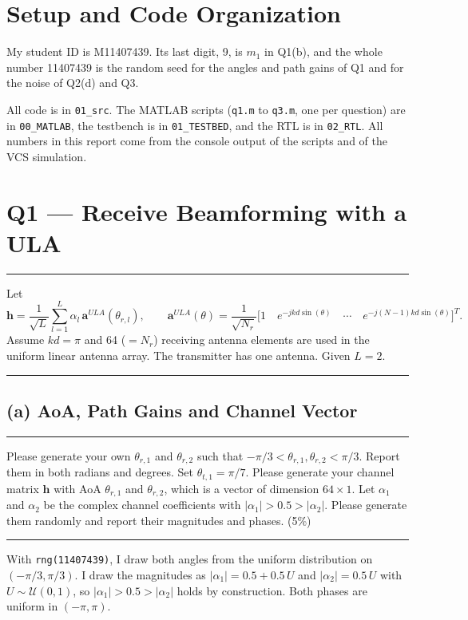 \documentclass[12pt,a4paper]{report}
\newcommand{\question}[1]{%
    \hrule
    \vspace{0.2cm}
    #1
    \vspace{0.2cm}
    \hrule
    \vspace{0.5cm}
}
\begin{document}
\chapter{Setup and Code Organization}
My student ID is M11407439. Its last digit, 9, is $m_1$ in Q1(b), and the whole number 11407439 is the random seed
for the angles and path gains of Q1 and for the noise of Q2(d) and Q3.

All code is in \texttt{01\_src}. The MATLAB scripts (\texttt{q1.m} to \texttt{q3.m}, one per question) are in
\texttt{00\_MATLAB}, the testbench is in \texttt{01\_TESTBED}, and the RTL is in \texttt{02\_RTL}. All numbers in this report come from the console output of the scripts and of the VCS simulation.

\newpage

\chapter{Q1 — Receive Beamforming with a ULA}
\question{Let
\[ \mathbf{h} = \frac{1}{\sqrt L}\sum_{l=1}^{L} \alpha_l\,\mathbf{a}^{ULA}(\theta_{r,l}), \qquad
\mathbf{a}^{ULA}(\theta) = \frac{1}{\sqrt{N_r}}\big[1 \quad e^{-jkd\sin(\theta)} \quad \cdots \quad e^{-j(N-1)kd\sin(\theta)}\big]^T . \]
Assume $kd = \pi$ and 64 ($= N_r$) receiving antenna elements are used in the uniform linear antenna array. The
transmitter has one antenna. Given $L = 2$.}

\section{(a) AoA, Path Gains and Channel Vector}

\question{Please generate your own $\theta_{r,1}$ and $\theta_{r,2}$ such that $-\pi/3 < \theta_{r,1}, \theta_{r,2} <
\pi/3$. Report them in both radians and degrees. Set $\theta_{t,1} = \pi/7$. Please generate your channel matrix
$\mathbf{h}$ with AoA $\theta_{r,1}$ and $\theta_{r,2}$, which is a vector of dimension $64 \times 1$. Let $\alpha_1$ and
$\alpha_2$ be the complex channel coefficients with $|\alpha_1| > 0.5 > |\alpha_2|$. Please generate them randomly and
report their magnitudes and phases. (5\%)}

With \texttt{rng(11407439)}, I draw both angles from the uniform distribution on $(-\pi/3, \pi/3)$. I draw the magnitudes as
$|\alpha_1| = 0.5 + 0.5\,U$ and $|\alpha_2| = 0.5\,U$ with $U \sim \mathcal{U}(0, 1)$, so $|\alpha_1| > 0.5 > |\alpha_2|$
holds by construction. Both phases are uniform in $(-\pi, \pi)$.
\end{document}

